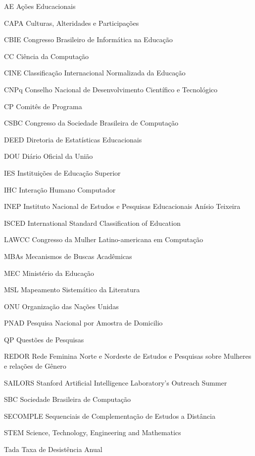 \begin{siglas}
    \item [AE] Ações Educacionais
    \item [CAPA] Culturas, Alteridades e Participações
    \item [CBIE] Congresso Brasileiro de Informática na Educação
    \item [CC] Ciência da Computação
    \item [CINE] Classificação Internacional Normalizada da Educação
    \item [CNPq] Conselho Nacional de Desenvolvimento Científico e Tecnológico
    \item [CP] Comitês de Programa
    \item [CSBC] Congresso da Sociedade Brasileira de Computação
    \item [DEED] Diretoria de Estatísticas Educacionais
    \item [DOU] Diário Oficial da União
    \item [IES] Instituições de Educação Superior
    \item [IHC] Interação Humano Computador
    \item [INEP] Instituto Nacional de Estudos e Pesquisas Educacionais Anísio Teixeira
    \item [ISCED] International Standard Classification of Education
    \item [LAWCC] Congresso da Mulher Latino-americana em Computação
    \item [MBAs] Mecanismos de Buscas Acadêmicas
    \item [MEC] Ministério da Educação
    \item [MSL] Mapeamento Sistemático da Literatura
    \item [ONU] Organização das Nações Unidas 
    \item [PNAD] Pesquisa Nacional por Amostra de Domicilio
    \item [QP] Questões de Pesquisas
    \item [REDOR] Rede Feminina Norte e Nordeste de Estudos e Pesquisas sobre Mulheres e relações de Gênero
    \item [SAILORS] Stanford Artificial Intelligence Laboratory’s Outreach Summer
    \item [SBC] Sociedade Brasileira de Computação
    \item [SECOMPLE] Sequenciais de Complementação de Estudos a Distância
    \item [STEM] Science, Technology, Engineering and Mathematics
    \item [Tada] Taxa de Desistência Anual

\end{siglas}
